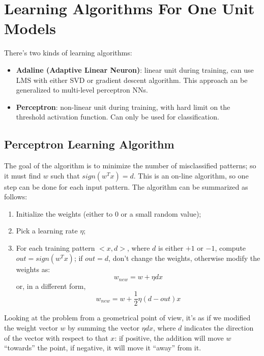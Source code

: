 \section{Learning Algorithms For One Unit Models}

There's two kinds of learning algorithms:
\begin{itemize}
    \item \textbf{Adaline (Adaptive Linear Neuron)}: linear unit during training, can use LMS with either SVD or gradient descent algorithm. This approach an be generalized to multi-level perceptron NNs.

    \item \textbf{Perceptron}: non-linear unit during training, with hard limit on the threshold activation function. Can only be used for classification.
\end{itemize}

\subsection{Perceptron Learning Algorithm}

The goal of the algorithm is to minimize the number of misclassified patterns; so it must find $w$ such that $sign(w^Tx)=d$. This is an on-line algorithm, so one step can be done for each input pattern. The algorithm can be summarized as follows:

\begin{enumerate}
    \item Initialize the weights (either to 0 or a small random value);

    \item Pick a learning rate $\eta$;

    \item For each training pattern $<x,d>$, where $d$ is either $+1$ or $-1$, compute $out = sign(w^Tx)$; if $out = d$, don't change the weights, otherwise modify the weights as:
    \begin{equation*}
        w_{new} = w + \eta d x
    \end{equation*}
    or, in a different form,
    \begin{equation*}
        w_{new} = w + \frac{1}{2} \eta (d-out) x
    \end{equation*}
\end{enumerate}

Looking at the problem from a geometrical point of view, it's as if we modified the weight vector $w$ by summing the vector $\eta d x$, where $d$ indicates the direction of the vector with respect to that $x$: if positive, the addition will move $w$ ``towards'' the point, if negative, it will move it ``away'' from it.

